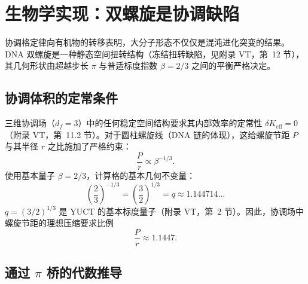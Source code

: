 \documentclass[12pt,a4paper]{article}
\newcommand{\Keff}{K_{\mathrm{eff}}}
\newcommand{\df}{d_{\!f}}
\begin{document}
	\section{生物学实现：双螺旋是协调缺陷}
	\label{sec:dna}
	
	协调格定律向有机物的转移表明，大分子形态不仅仅是混沌进化突变的结果。DNA 双螺旋是一种静态空间扭转结构（冻结扭转缺陷，见附录 VT，第~12 节），其几何形状由超越步长 $\pi$ 与普适标度指数 $\beta = 2/3$ 之间的平衡严格决定。
	
	\subsection{协调体积的定常条件}
	
	三维协调场（$\df=3$）中的任何稳定空间结构要求其内部效率的定常性 $\delta\Keff = 0$（附录 VT，第~11.2 节）。对于圆柱螺旋线（DNA 链的体现），这给螺旋节距 $P$ 与其半径 $r$ 之比施加了严格约束：
	\begin{equation}
		\frac{P}{r} \propto \beta^{-1/3}.
		\label{eq:dna-pr}
	\end{equation}
	使用基本量子 $\beta = 2/3$，计算格的基本几何不变量：
	\begin{equation}
		\left(\frac{2}{3}\right)^{-1/3} = \left(\frac{3}{2}\right)^{1/3} = q \approx 1.144714\ldots
		\label{eq:q-def}
	\end{equation}
	$q = (3/2)^{1/3}$ 是 YUCT 的基本标度量子（附录 VT，第~2 节）。因此，协调场中螺旋节距的理想压缩要求比例
	\begin{equation}
		\frac{P}{r} \approx 1.1447.
		\label{eq:pr-ideal}
	\end{equation}
	
	\subsection{通过 $\pi$ 桥的代数推导}
	
\end{document}
